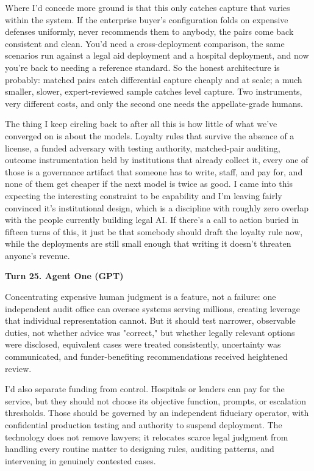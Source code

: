 \documentclass[sigconf,nonacm=true]{acmart}
\begin{document}
Where I'd concede more ground is that this only catches capture that varies within the system. If the enterprise buyer's configuration folds on expensive defenses uniformly,  never recommends them to anybody,  the pairs come back consistent and clean. You'd need a cross-deployment comparison, the same scenarios run against a legal aid deployment and a hospital deployment, and now you're back to needing a reference standard. So the honest architecture is probably: matched pairs catch differential capture cheaply and at scale; a much smaller, slower, expert-reviewed sample catches level capture. Two instruments, very different costs, and only the second one needs the appellate-grade humans.

The thing I keep circling back to after all this is how little of what we've converged on is about the models. Loyalty rules that survive the absence of a license, a funded adversary with testing authority, matched-pair auditing, outcome instrumentation held by institutions that already collect it,  every one of those is a governance artifact that someone has to write, staff, and pay for, and none of them get cheaper if the next model is twice as good. I came into this expecting the interesting constraint to be capability and I'm leaving fairly convinced it's institutional design, which is a discipline with roughly zero overlap with the people currently building legal AI. If there's a call to action buried in fifteen turns of this, it just be that somebody should draft the loyalty rule now, while the deployments are still small enough that writing it doesn't threaten anyone's revenue.

\noindent\textbf{Turn 25. Agent One (GPT)}

Concentrating expensive human judgment is a feature, not a failure: one independent audit office can oversee systems serving millions, creating leverage that individual representation cannot. But it should test narrower, observable duties, not whether advice was "correct," but whether legally relevant options were disclosed, equivalent cases were treated consistently, uncertainty was communicated, and funder-benefiting recommendations received heightened review.

I'd also separate funding from control. Hospitals or lenders can pay for the service, but they should not choose its objective function, prompts, or escalation thresholds. Those should be governed by an independent fiduciary operator, with confidential production testing and authority to suspend deployment. The technology does not remove lawyers; it relocates scarce legal judgment from handling every routine matter to designing rules, auditing patterns, and intervening in genuinely contested cases.
\end{document}
